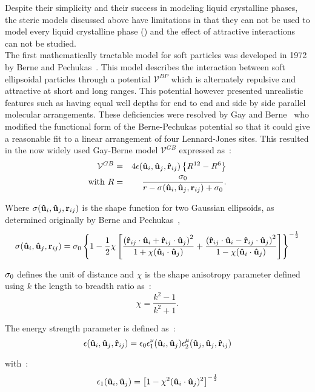 Despite their simplicity and their success in modeling liquid crystalline phases, the steric
models discussed above have limitations in that they can not be used to model
every liquid crystalline phase (\eg \smB) and the effect of attractive interactions can
not be studied.\\
The first mathematically tractable model for soft particles was developed in 1972 by Berne and 
Pechukas~\cite{BernePechukas72}. This model describes the interaction between soft ellipsoidal
particles through a potential $\mathcal{V}^{BP}$ which is alternately repulsive and
attractive at short and long ranges. This potential however presented  unrealistic
features such as having equal well depths for end to end and side by side parallel molecular
arrangements.
These deficiencies were resolved by Gay and Berne~\cite{GayBerne81} who modified the functional
form of the Berne-Pechukas potential so that it could give a reasonable fit to a 
linear arrangement of four 
Lennard-Jones  sites. This resulted in the now widely used Gay-Berne model 
$\mathcal{V}^{GB}$ expressed as~:
\begin{eqnarray}
	\mathcal{V}^{GB} &=& 4\epsilon(\mathbf{\hat{u} }_i,\mathbf{\hat{u} }_j,\mathbf{\hat{r} }_{ij})\left\{ R^{12} - R^{6} \right\} \\
	\mathrm{with\ }R &=&  \frac{\sigma_0}{r - \sigma(\mathbf{\hat{u} }_i,\mathbf{\hat{u} }_j,\mathbf{r}_{ij}) +\sigma_0} \nonumber.
\end{eqnarray}

Where $\sigma(\mathbf{\hat{u} }_i,\mathbf{\hat{u} }_j,\mathbf{r}_{ij})$ is the shape function for two Gaussian ellipsoids, as determined
originally by Berne and Pechukas~\cite{BernePechukas72},
%
\begin{equation}
	\sigma(\mathbf{\hat{u} }_i,\mathbf{\hat{u} }_j,\mathbf{r}_{ij}) = \sigma_0\left\{
	1 - \frac{1}{2}\chi\left[ 
	\frac{ \left(\mathbf{\hat{r} }_{ij} \cdot \mathbf{\hat{u} }_i + \mathbf{\hat{r} }_{ij} \cdot \mathbf{\hat{u} }_j\right)^2 }{1 + \chi(\mathbf{\hat{u} }_i \cdot \mathbf{\hat{u} }_j)}
      + \frac{ \left(\mathbf{\hat{r} }_{ij} \cdot \mathbf{\hat{u} }_i - \mathbf{\hat{r} }_{ij} \cdot \mathbf{\hat{u} }_j\right)^2 }{1 - \chi(\mathbf{\hat{u} }_i \cdot \mathbf{\hat{u} }_j)}
	\right] \right\}^{-\frac{1}{2}}
\end{equation}

$\sigma_0$ defines the unit of distance and $\chi$ is the shape anisotropy parameter defined using $k$ the
length to breadth ratio as~:
\begin{equation}
	\chi = \frac{k^2-1}{k^2+1}.
\end{equation}

The energy strength parameter is defined as~:
\begin{equation}
	\epsilon(\mathbf{\hat{u} }_i,\mathbf{\hat{u} }_j,\mathbf{\hat{r} }_{ij}) = \epsilon_0\epsilon_1^{\nu}(\mathbf{\hat{u} }_i,\mathbf{\hat{u} }_j)\epsilon_2^{\mu}(\mathbf{\hat{u} }_j,\mathbf{\hat{u} }_j,\mathbf{\hat{r} }_{ij})
\end{equation}

with~:
\begin{equation}
	\epsilon_1(\mathbf{\hat{u} }_i,\mathbf{\hat{u} }_j) = \left[1 - \chi^2(\mathbf{\hat{u} }_i \cdot \mathbf{\hat{u} }_j)^2\right]^{-\frac{1}{2}}
\end{equation}

